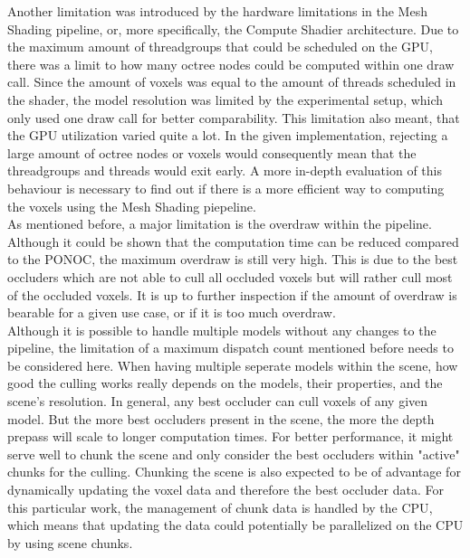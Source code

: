 \noindent
Another limitation was introduced by the hardware limitations in the Mesh Shading pipeline, or, more specifically, the 
Compute Shadier architecture. Due to the maximum amount of threadgroups that could be scheduled on the \ac{GPU}, there 
was a limit to how many octree nodes could be computed within one draw call. Since the amount of voxels was equal to the 
amount of threads scheduled in the shader, the model resolution was limited by the experimental setup, which only used 
one draw call for better comparability. This limitation also meant, that the \ac{GPU} utilization varied quite a lot. 
In the given implementation, rejecting a large amount of octree nodes or voxels would consequently mean that the 
threadgroups and threads would exit early. A more in-depth evaluation of this behaviour is necessary to find out if 
there is a more efficient way to computing the voxels using the Mesh Shading piepeline. \\

\noindent
As mentioned before, a major limitation is the overdraw within the pipeline. Although it could be shown that the 
computation time can be reduced compared to the \ac{PONOC}, the maximum overdraw is still 
very high. This is due to the best occluders which are not able to cull all occluded voxels but will rather cull 
most of the occluded voxels. It is up to further inspection if the amount of overdraw is bearable for a given use 
case, or if it is too much overdraw. \\

\noindent
Although it is possible to handle multiple models without any changes to the pipeline, the limitation of a maximum 
dispatch count mentioned before needs to be considered here. When having multiple seperate models within the scene, 
how good the culling works really depends on the models, their properties, and the scene's resolution. In general, 
any best occluder can cull voxels of any given model. But the more best occluders present in the scene, the more 
the depth prepass will scale to longer computation times. For better performance, it might serve well to chunk the 
scene and only consider the best occluders within "active" chunks for the culling. Chunking the scene is also 
expected to be of advantage for dynamically updating the voxel data and therefore the best occluder data. For this 
particular work, the management of chunk data is handled by the \ac{CPU}, which means that updating the data could 
potentially be parallelized on the \ac{CPU} by using scene chunks. \\
 
